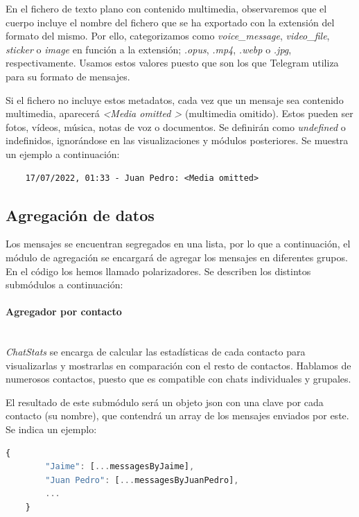 En el fichero de texto plano con contenido multimedia, observaremos que el cuerpo incluye el nombre del fichero que se ha exportado con la extensión del formato del mismo. Por ello, categorizamos como \textit{voice\_message}, \textit{video\_file}, \textit{sticker} o \textit{image} en función a la extensión; \textit{.opus}, \textit{.mp4}, \textit{.webp} o \textit{.jpg}, respectivamente. Usamos estos valores puesto que son los que Telegram utiliza para su formato de mensajes.

Si el fichero no incluye estos metadatos, cada vez que un mensaje sea contenido multimedia, aparecerá \textit{\textless Media omitted \textgreater} (multimedia omitido). Estos pueden ser fotos, vídeos, música, notas de voz o documentos. Se definirán como \textit{undefined} o indefinidos, ignorándose en las visualizaciones y módulos posteriores. Se muestra un ejemplo a continuación:

\begin{lstlisting}
	17/07/2022, 01:33 - Juan Pedro: <Media omitted>
\end{lstlisting}

\subsection{Agregación de datos}

Los mensajes se encuentran segregados en una lista, por lo que a continuación, el módulo de agregación se encargará de agregar los mensajes en diferentes grupos. En el código los hemos llamado polarizadores. Se describen los distintos submódulos a continuación:

\paragraph{Agregador por contacto}\mbox{}\\

\textit{ChatStats} se encarga de calcular las estadísticas de cada contacto para visualizarlas y mostrarlas en comparación con el resto de contactos. Hablamos de numerosos contactos, puesto que es compatible con chats individuales y grupales.

El resultado de este submódulo será un objeto \acrshort{json} con una clave por cada contacto (su nombre), que contendrá un array de los mensajes enviados por este. Se indica un ejemplo:

\begin{lstlisting}[language=JavaScript]
	{
		"Jaime": [...messagesByJaime],
		"Juan Pedro": [...messagesByJuanPedro],
		...
	}
\end{lstlisting}

